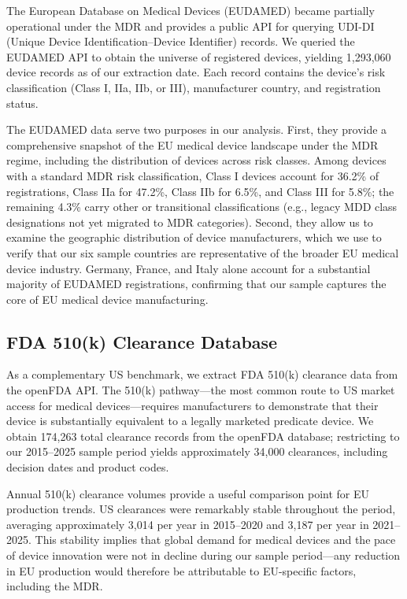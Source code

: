 \documentclass[12pt]{article}
\begin{document}
The European Database on Medical Devices (EUDAMED) became partially operational under the MDR and provides a public API for querying UDI-DI (Unique Device Identification--Device Identifier) records. We queried the EUDAMED API to obtain the universe of registered devices, yielding 1,293,060 device records as of our extraction date. Each record contains the device's risk classification (Class I, IIa, IIb, or III), manufacturer country, and registration status.

The EUDAMED data serve two purposes in our analysis. First, they provide a comprehensive snapshot of the EU medical device landscape under the MDR regime, including the distribution of devices across risk classes. Among devices with a standard MDR risk classification, Class I devices account for 36.2\% of registrations, Class IIa for 47.2\%, Class IIb for 6.5\%, and Class III for 5.8\%; the remaining 4.3\% carry other or transitional classifications (e.g., legacy MDD class designations not yet migrated to MDR categories). Second, they allow us to examine the geographic distribution of device manufacturers, which we use to verify that our six sample countries are representative of the broader EU medical device industry. Germany, France, and Italy alone account for a substantial majority of EUDAMED registrations, confirming that our sample captures the core of EU medical device manufacturing.

\subsection{FDA 510(k) Clearance Database}

As a complementary US benchmark, we extract FDA 510(k) clearance data from the openFDA API. The 510(k) pathway---the most common route to US market access for medical devices---requires manufacturers to demonstrate that their device is substantially equivalent to a legally marketed predicate device. We obtain 174,263 total clearance records from the openFDA database; restricting to our 2015--2025 sample period yields approximately 34,000 clearances, including decision dates and product codes.

Annual 510(k) clearance volumes provide a useful comparison point for EU production trends. US clearances were remarkably stable throughout the period, averaging approximately 3,014 per year in 2015--2020 and 3,187 per year in 2021--2025. This stability implies that global demand for medical devices and the pace of device innovation were not in decline during our sample period---any reduction in EU production would therefore be attributable to EU-specific factors, including the MDR.
\end{document}
